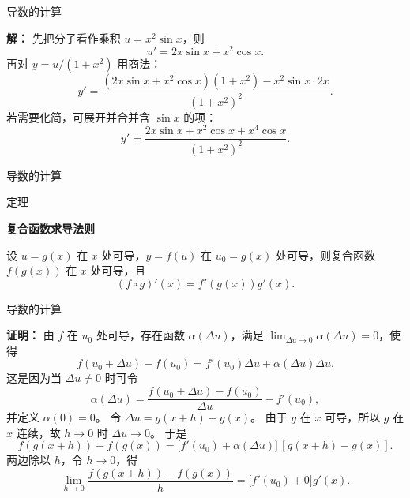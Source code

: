 \documentclass[aspectratio=169,10pt,fontset=fandol]{ctexbeamer}
\newenvironment{warning}{\par\noindent\textbf{注：}\quad}{\par\vspace{0.8em}}
\begin{document}
\begin{frame}[t,fragile]{导数的计算}
\footnotesize
{\footnotesize
\textbf{解：}
先把分子看作乘积 $u=x^2\sin x$，则
\[
u'=2x\sin x+x^2\cos x.
\]
再对 $y=u/(1+x^2)$ 用商法：
\[
y'=\frac{(2x\sin x+x^2\cos x)(1+x^2)-x^2\sin x\cdot2x}{(1+x^2)^2}.
\]
若需要化简，可展开并合并含 $\sin x$ 的项：
\[
y'=\frac{2x\sin x+x^2\cos x+x^4\cos x}{(1+x^2)^2}.
\]

}
\end{frame}
\begin{frame}[t,fragile]{导数的计算}
\footnotesize
\begin{block}{定理}
{\footnotesize
\textbf{复合函数求导法则}\par

设 $u=g(x)$ 在 $x$ 处可导，$y=f(u)$ 在 $u_0=g(x)$ 处可导，则复合函数 $f(g(x))$ 在 $x$ 处可导，且
\[
(f\circ g)'(x)=f'(g(x))g'(x).
\]

}
\end{block}
\end{frame}
\begin{frame}[t,fragile]{导数的计算}
\footnotesize
{\footnotesize
\textbf{证明：}
由 $f$ 在 $u_0$ 处可导，存在函数 $\alpha(\Delta u)$，满足 $\lim_{\Delta u\to0}\alpha(\Delta u)=0$，使得
\[
f(u_0+\Delta u)-f(u_0)=f'(u_0)\Delta u+\alpha(\Delta u)\Delta u.
\]
这是因为当 $\Delta u\neq0$ 时可令
\[
\alpha(\Delta u)=\frac{f(u_0+\Delta u)-f(u_0)}{\Delta u}-f'(u_0),
\]
并定义 $\alpha(0)=0$。 令 $\Delta u=g(x+h)-g(x)$。 由于 $g$ 在 $x$ 可导，所以 $g$ 在 $x$ 连续，故 $h\to0$ 时 $\Delta u\to0$。 于是
\[
f(g(x+h))-f(g(x))
=\bigl[f'(u_0)+\alpha(\Delta u)\bigr]\,[g(x+h)-g(x)].
\]
两边除以 $h$，令 $h\to0$，得
\[
\lim_{h\to0}\frac{f(g(x+h))-f(g(x))}{h}
=\bigl[f'(u_0)+0\bigr]g'(x).
\]

}
\end{frame}
\end{document}
